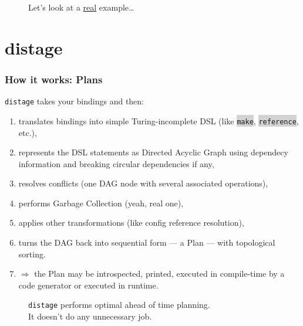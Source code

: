 \documentclass[usenames,dvipsnames,aspectratio=169]{beamer}
\newcommand{\code}[1]{\colorbox{lightgray}{\texttt{#1}}}
\newcommand{\distage}{\texttt{distage}\xspace}
\begin{document}
\begin{frame}
  \begin{figure}
  \Huge Let's look at a \underline{real} example\dots
  \end{figure}
\end{frame}

\section{distage}
\begin{frame}
  \frametitle{How it works: Plans}
  \distage takes your bindings and then:
  \begin{enumerate}
    \item translates bindings into simple Turing-incomplete DSL (like \code{make}, \code{reference}, etc.),
    \item represents the DSL statements as Directed Acyclic Graph using dependecy information and breaking circular dependencies if any,
    \item resolves conflicts (one DAG node with several associated operations),
    \item performs Garbage Collection (yeah, real one),
    \item applies other transformations (like config reference resolution),
    \item turns the DAG back into sequential form --- a Plan --- with topological sorting.
    \item $\Rightarrow$ the Plan may be introspected, printed, executed in compile-time by a code generator or executed in runtime.
  \end{enumerate}
\end{frame}

\begin{frame}
  \begin{figure}
    \huge \distage performs optimal ahead of time planning.
    \\
    It doesn't  do any unnecessary job.
  \end{figure}
\end{frame}
\end{document}
